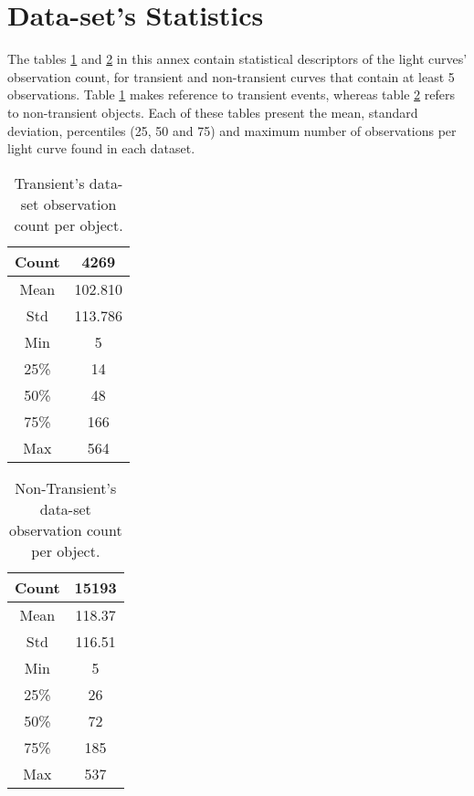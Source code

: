 \documentclass[a4paper,fleqn,usenatbib]{mnras}
\begin{document}
\section{Data-set's Statistics}

The tables \ref{Transient-Observation-Count} and \ref{Non-Transient-Observation-Count} in this annex contain statistical descriptors of the light curves' observation count, for transient and non-transient curves that contain at least 5 observations.
Table \ref{Transient-Observation-Count} makes reference to transient events, whereas table \ref{Non-Transient-Observation-Count} refers to non-transient objects. 
Each of these tables present the mean, standard deviation, percentiles (25, 50 and 75) and maximum number of observations per light curve found in each dataset.

\newpage
\pagebreak

\begin{table}
\centering
\begin{tabular}{c|c}
    \hline
    Count & 4269 \\
    \hline
    Mean & 102.810 \\
    Std & 113.786 \\
    Min & 5 \\
    25\% & 14 \\
    50\% & 48 \\
    75\% & 166 \\
    Max & 564 \\
    \hline
\end{tabular}
\caption{Transient's data-set observation count per object.}
\label{Transient-Observation-Count}
\end{table}

\begin{table}
\centering
\begin{tabular}{c|c}
    \hline
    Count & 15193 \\
    \hline
    Mean & 118.37 \\
    Std & 116.51 \\
    Min & 5 \\
    25\% & 26 \\
    50\% & 72 \\
    75\% & 185 \\
    Max & 537 \\
    \hline
\end{tabular}
\caption{Non-Transient's data-set observation count per object.}
\label{Non-Transient-Observation-Count}
\end{table}
\end{document}
